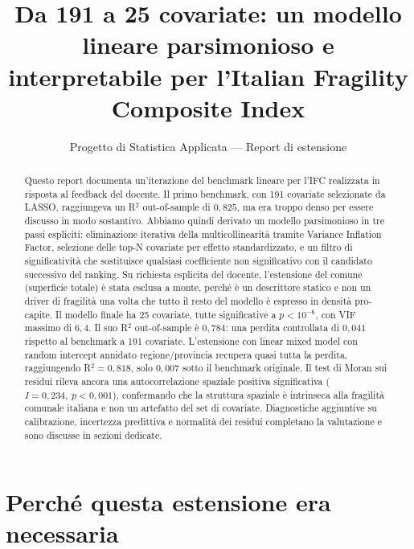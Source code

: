 \documentclass[11pt,a4paper]{article}
\title{Da 191 a 25 covariate: un modello lineare parsimonioso e\\
  interpretabile per l'Italian Fragility Composite Index}
\author{Progetto di Statistica Applicata --- Report di estensione}
\date{}
\begin{document}
\maketitle

\begin{abstract}
\noindent
Questo report documenta un'iterazione del benchmark lineare per
l'IFC realizzata in risposta al feedback del docente. Il primo
benchmark, con 191 covariate selezionate da LASSO, raggiungeva un
R$^{2}$ out-of-sample di $0{,}825$, ma era troppo denso per essere
discusso in modo sostantivo. Abbiamo quindi derivato un modello
parsimonioso in tre passi espliciti: eliminazione iterativa della
multicollinearit\`a tramite Variance Inflation Factor, selezione
delle top-N covariate per effetto standardizzato, e un filtro di
significativit\`a che sostituisce qualsiasi coefficiente non
significativo con il candidato successivo del ranking. Su richiesta
esplicita del docente, l'estensione del comune (superficie totale)
\`e stata esclusa a monte, perch\'e \`e un descrittore statico e non
un driver di fragilit\`a una volta che tutto il resto del modello
\`e espresso in densit\`a pro-capite. Il modello finale ha 25
covariate, tutte significative a $p < 10^{-6}$, con VIF massimo di
$6{,}4$. Il suo R$^{2}$ out-of-sample \`e $0{,}784$: una perdita
controllata di $0{,}041$ rispetto al benchmark a 191 covariate.
L'estensione con linear mixed model con random intercept annidato
regione/provincia recupera quasi tutta la perdita, raggiungendo
R$^{2} = 0{,}818$, solo $0{,}007$ sotto il benchmark originale. Il
test di Moran sui residui rileva ancora una autocorrelazione
spaziale positiva significativa ($I = 0{,}234,\ p < 0{,}001$),
confermando che la struttura spaziale \`e intrinseca alla
fragilit\`a comunale italiana e non un artefatto del set di
covariate. Diagnostiche aggiuntive su calibrazione, incertezza
predittiva e normalit\`a dei residui completano la valutazione e
sono discusse in sezioni dedicate.
\end{abstract}

\section*{Perch\'e questa estensione era necessaria}
\end{document}
